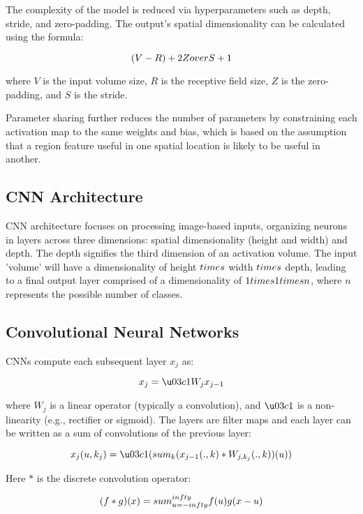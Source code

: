 \documentclass{article}
\begin{document}
The complexity of the model is reduced via hyperparameters such as depth, stride, and zero-padding. The output's spatial dimensionality can be calculated using the formula:

$$(V - R) + 2Z \\over S + 1$$

where $V$ is the input volume size, $R$ is the receptive field size, $Z$ is the zero-padding, and $S$ is the stride.

Parameter sharing further reduces the number of parameters by constraining each activation map to the same weights and bias, which is based on the assumption that a region feature useful in one spatial location is likely to be useful in another.

\subsection*{CNN Architecture}
CNN architecture focuses on processing image-based inputs, organizing neurons in layers across three dimensions: spatial dimensionality (height and width) and depth. The depth signifies the third dimension of an activation volume. The input 'volume' will have a dimensionality of height $\\times$ width $\\times$ depth, leading to a final output layer comprised of a dimensionality of $1 \\times 1 \\times n$, where $n$ represents the possible number of classes.

\subsection*{Convolutional Neural Networks}
CNNs compute each subsequent layer $x_j$ as:

$$x_j = \u03c1W_jx_{j-1}$$

where $W_j$ is a linear operator (typically a convolution), and $\u03c1$ is a non-linearity (e.g., rectifier or sigmoid). The layers are filter maps and each layer can be written as a sum of convolutions of the previous layer:

$$x_j(u, k_j) = \u03c1(\\sum_k (x_{j-1}(., k) * W_{j,k_j}(., k))(u))$$

Here $*$ is the discrete convolution operator:

$$(f * g)(x) = \\sum_{u=-\\infty}^{\\infty} f(u)g(x - u)$$
\end{document}
